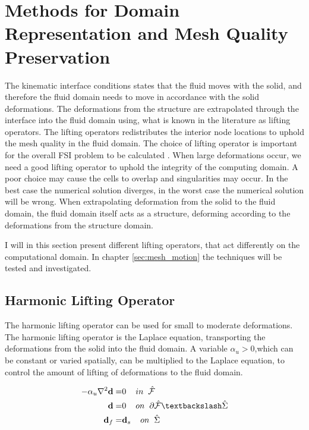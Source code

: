 \section{Methods for Domain Representation and Mesh Quality Preservation} \label{sec:meshmotion}
The kinematic interface conditions states that the fluid moves with the solid, and therefore the fluid domain needs to move in accordance with the solid deformations. The deformations from the structure are extrapolated through the interface into the fluid domain using, what is known in the literature as lifting operators. The lifting operators redistributes the interior node locations to uphold the mesh quality in the fluid domain.
The choice of lifting operator is important for the overall FSI problem to be calculated \cite{Wick2011a}. When large deformations occur, we need a good lifting operator to uphold the integrity of the computing domain. A poor choice may cause the cells to overlap and singularities may occur. In the best case the numerical solution diverges, in the worst case the numerical solution will be wrong.
When extrapolating deformation from the solid to the fluid domain, the fluid domain itself acts as a structure, deforming according to the deformations from the structure domain.\newline

I will in this section present different lifting operators, that act differently on the computational domain. In chapter \ref{sec:mesh_motion} the techniques will be tested and investigated.

\subsection{Harmonic Lifting Operator}
The harmonic lifting operator can be used for small to moderate deformations. The harmonic lifting operator is the Laplace equation, transporting the deformations from the solid into the fluid domain. A variable $\alpha_u > 0$,which can be constant or varied spatially, can be multiplied to the Laplace equation, to control the amount of lifting of deformations to the fluid domain.

\begin{align}
 - \alpha_u \nabla^2 \bold{d} =& 0\hspace{4mm} in \hspace{2mm} \hat{\mathcal{F}}\\
  \hspace{4mm} \bold{d} =& 0 \hspace{4mm } on \hspace{2mm }  \partial \hat{\mathcal{F}} \textbackslash \hat{\Sigma} \\
  \bold{d}_f =& \bold{d}_s \hspace{4mm } on \hspace{2mm } \hat{\Sigma} 
\end{align}

